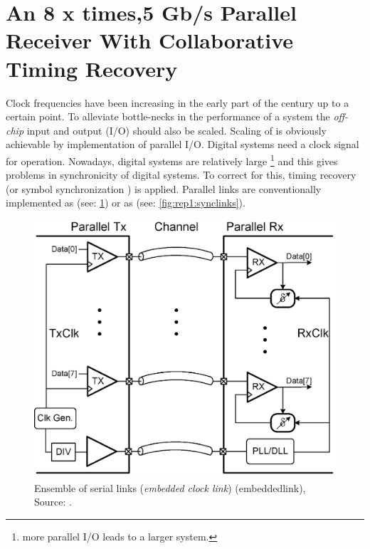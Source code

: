 
\section{An 8 x times,5 Gb/s Parallel Receiver With Collaborative Timing Recovery \cite{agrawal20098}}  \label{ss:agrawal20098}

Clock frequencies have been increasing in the early part of the century up to a certain point.
To alleviate bottle-necks in the performance of a system the \textit{off-chip} input and output (I/O) should also be scaled.
Scaling of  is obviously achievable by implementation of parallel I/O.
Digital systems need a clock signal for operation.
Nowadays, digital systems are relatively large \footnote{more parallel I/O leads to a larger system.} and this gives problems in synchronicity of digital systems.
To correct for this, timing recovery (or symbol synchronization \cite{mueller1976timing}) is applied.
Parallel links are conventionally implemented as  (see: \cref{fig:rep1:seriallinks}) or as   (see: \cref{fig:rep1:synclinks}).

\begin{figure}	\centering
	
	\includegraphics[width=0.8\linewidth]{Figures/Rep1SourceSync.png}
	\caption{Ensemble of serial links (\textit{embedded clock link}) (\ac{embeddedlink}), Source: \cite{agrawal20098}.} 
    \label{fig:rep1:seriallinks}
\end{figure}

